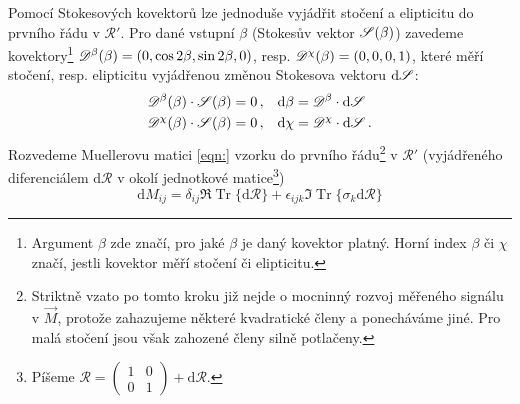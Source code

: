 Pomocí Stokesových kovektorů lze jednoduše vyjádřit stočení a elipticitu do prvního řádu v $\mathcal{R}'$.
Pro dané vstupní $\beta$ (Stokesův vektor $\mathscr{S}(\beta)$) zavedeme kovektory\footnote{Argument $\beta$ zde značí, pro jaké $\beta$ je daný kovektor platný. Horní index $\beta$ či $\chi$ značí, jestli kovektor měří stočení či elipticitu.} $\mathscr{D}^\beta(\beta)=(0, \cos2\beta, \sin2\beta, 0)$, resp. $\mathscr{D}^\chi(\beta)=(0, 0, 0, 1)$, které měří stočení, resp. elipticitu vyjádřenou změnou Stokesova vektoru $\textrm{d}\mathscr{S}$:
\begin{align}
    \mathscr{D}^\beta(\beta) \cdot \mathscr{S}(\beta) = 0 \,, \quad &\textrm{d}\beta = \mathscr{D}^\beta \cdot \textrm{d}\mathscr{S} \\
    \mathscr{D}^\chi(\beta) \cdot \mathscr{S}(\beta) = 0 \,, \quad &\textrm{d}\chi = \mathscr{D}^\chi \cdot \textrm{d}\mathscr{S} \,.
\end{align}
Rozvedeme Muellerovu matici \eqref{eqn:} vzorku do prvního řádu\footnote{Striktně vzato po tomto kroku již nejde o mocninný rozvoj měřeného signálu v $\vec{M}$, protože zahazujeme některé kvadratické členy a ponecháváme jiné. Pro malá stočení jsou však zahozené členy silně potlačeny.} v $\mathcal{R}'$ (vyjádřeného diferenciálem $\textrm{d}\mathcal{R}$ v okolí jednotkové matice\footnote{Píšeme $\mathcal{R}= \begin{pmatrix} 1&0\\0&1 \end{pmatrix} + \textrm{d}\mathcal{R}$.}) 
\begin{equation}
\label{eqn:dif-Mueller}
    \textrm{d}M_{ij} = \delta_{ij} \Re\operatorname{Tr}\lbrace\textrm{d}\mathcal{R}\rbrace + \epsilon_{ijk} \Im\operatorname{Tr}\lbrace\sigma_k\textrm{d}\mathcal{R}\rbrace
\end{equation}

